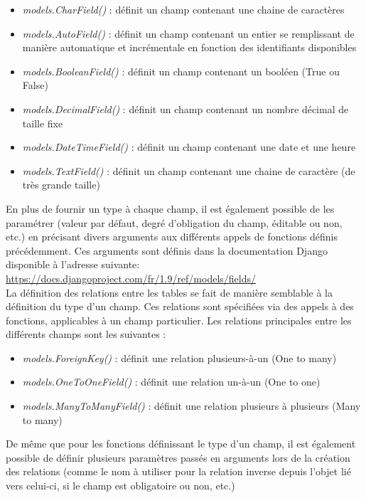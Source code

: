 \begin{itemize}
\item \textit{models.CharField()} : définit un champ contenant une chaine de caractères
\item \textit{models.AutoField()} : définit un champ contenant un entier se remplissant de manière automatique et incrémentale en fonction des identifiants disponibles
\item \textit{models.BooleanField()} : définit un champ contenant un booléen (True ou False)
\item \textit{models.DecimalField()} : définit un champ contenant un nombre décimal de taille fixe
\item \textit{models.DateTimeField()} : définit un champ contenant une date et une heure
\item \textit{models.TextField()} : définit un champ contenant une chaine de caractère (de très grande taille)\\
\end{itemize}

En plus de fournir un type à chaque champ, il est également possible de les paramétrer (valeur par défaut, degré d'obligation du champ, éditable ou non, etc.) en précisant divers arguments aux différents appels de fonctions définis précédemment. Ces arguments sont définis dans la documentation Django disponible à l'adresse suivante: \url{https://docs.djangoproject.com/fr/1.9/ref/models/fields/}\\

La définition des relations entre les tables se fait de manière semblable à la définition du type d'un champ. Ces relations sont spécifiées via des appels à des fonctions, applicables à un champ particulier. Les relations principales entre les différents champs sont les suivantes :\\

\begin{itemize}
\item \textit{models.ForeignKey()} : définit une relation plusieurs-à-un (One to many)
\item \textit{models.OneToOneField()} : définit une relation un-à-un (One to one)
\item \textit{models.ManyToManyField()} : définit une relation plusieurs à plusieurs (Many to many)\\
\end{itemize}

De même que pour les fonctions définissant le type d'un champ, il est également possible de définir plusieurs paramètres passés en arguments lors de la création des relations  (comme le nom à utiliser pour la relation inverse depuis l’objet lié vers celui-ci, si le champ est obligatoire ou non, etc.)\\

